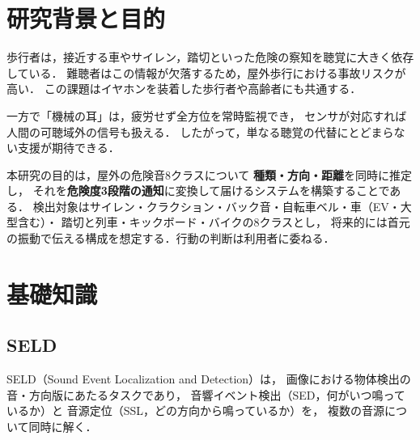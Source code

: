 \documentclass[twocolumn,a4paper,9pt]{jsarticle}
\begin{document}

\section{研究背景と目的}

歩行者は，接近する車やサイレン，踏切といった危険の察知を聴覚に大きく依存している．
難聴者はこの情報が欠落するため，屋外歩行における事故リスクが高い．
この課題はイヤホンを装着した歩行者や高齢者にも共通する．

一方で「機械の耳」は，疲労せず全方位を常時監視でき，
センサが対応すれば人間の可聴域外の信号も扱える．
したがって，単なる聴覚の代替にとどまらない支援が期待できる．

本研究の目的は，屋外の危険音8クラスについて
\textbf{種類・方向・距離}を同時に推定し，
それを\textbf{危険度3段階の通知}に変換して届けるシステムを構築することである．
検出対象はサイレン・クラクション・バック音・自転車ベル・車（EV・大型含む）・
踏切と列車・キックボード・バイクの8クラスとし，
将来的には首元の振動で伝える構成を想定する．行動の判断は利用者に委ねる．

\section{基礎知識}

\subsection{SELD}
SELD（Sound Event Localization and Detection）は，
画像における物体検出の音・方向版にあたるタスクであり，
音響イベント検出（SED，何がいつ鳴っているか）と
音源定位（SSL，どの方向から鳴っているか）を，
複数の音源について同時に解く\cite{adavanne}．
\end{document}
